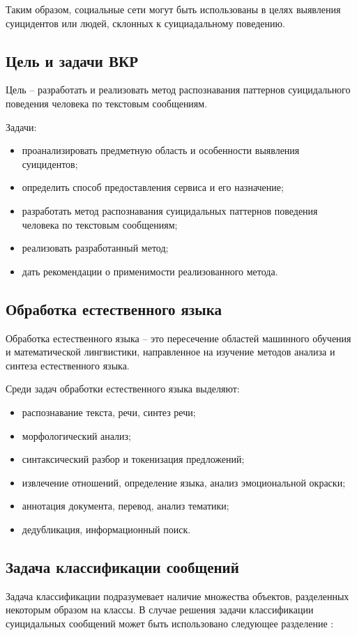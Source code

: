 Таким образом, социальные сети могут быть использованы в целях выявления суицидентов или людей, склонных к суициадальному поведению.

\subsection{Цель и задачи ВКР}
Цель -- разработать и реализовать метод распознавания паттернов суицидального поведения человека по текстовым сообщениям.

Задачи:
\begin{itemize}
	\item проанализировать предметную область и особенности выявления суицидентов;
	\item определить способ предоставления сервиса и его назначение;
	\item разработать метод распознавания суицидальных паттернов поведения человека по текстовым сообщениям;
	\item реализовать разработанный метод;
	\item дать рекомендации о применимости реализованного метода.
\end{itemize}

\subsection{Обработка естественного языка}

Обработка естественного языка -- это пересечение областей машинного обучения и математической лингвистики, направленное на изучение методов анализа и синтеза естественного языка.

Среди задач обработки естественного языка выделяют:
\begin{itemize}
\item распознавание текста, речи, синтез речи;
\item морфологический анализ;
\item синтаксический разбор и токенизация предложений;
\item извлечение отношений, определение языка, анализ эмоциональной окраски;
\item аннотация документа, перевод, анализ тематики;
\item дедубликация, информационный поиск.
\end{itemize}

\subsection{Задача классификации сообщений}
Задача классификации подразумевает наличие множества объектов, разделенных некоторым образом на классы. В случае решения задачи классификации суицидальных сообщений может быть использовано следующее разделение \cite{presuicidalSignals}:

